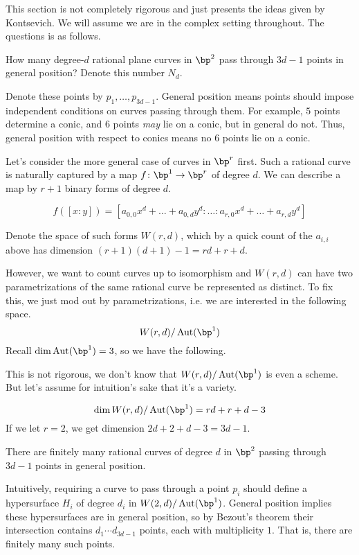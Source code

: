 \documentclass[12pt]{article}
\begin{document}
This section is not completely rigorous and just presents the ideas given by Kontsevich. We will assume we are in the complex setting throughout. The questions is as follows.

\begin{question}
  How many degree-$d$ rational plane curves in $\bp^2$ pass through $3d-1$ points in general position? Denote this number $N_d$.
\end{question}

Denote these points by $p_1, \ldots, p_{3d-1}$. General position means points should impose independent conditions on curves passing through them. For example, $5$ points determine a conic, and $6$ points \textit{may} lie on a conic, but in general do not. Thus, general position with respect to conics means no $6$ points lie on a conic.

Let's consider the more general case of curves in $\bp^r$ first. Such a rational curve is naturally captured by a map $f \colon \bp^1 \to \bp^r$ of degree $d$. We can describe a map by $r+1$ binary forms of degree $d$.

\[f([x \colon y]) = [a_{0,0}x^d + \ldots + a_{0,d}y^d\colon \ldots \colon a_{r,0}x^d + \ldots + a_{r,d}y^d]  \]

Denote the space of such forms $W(r,d)$, which by a quick count of the $a_{i,i}$ above has dimension $(r+1)(d+1) - 1 = rd +r + d$. 

However, we want to count curves up to isomorphism and $W(r,d)$ can have two parametrizations of the same rational curve be represented as distinct. To fix this, we just mod out by parametrizations, i.e. we are interested in the following space.
\[W(r,d)/\Aut(\bp^1)\]
Recall $\dim \Aut(\bp^1) = 3$, so we have the following.
\begin{note}
  This is not rigorous, we don't know that $W(r,d)/\Aut(\bp^1)$ is even a scheme. But let's assume for intuition's sake that it's a variety.
\end{note}
\[\dim W(r,d)/\Aut(\bp^1) = rd + r + d - 3\]
If we let $r = 2$, we get dimension $2d + 2 + d - 3 = 3d - 1$.
\begin{cor}
  There are finitely many rational curves of degree $d$ in $\bp^2$ passing through $3d-1$ points in general position.
\end{cor}

Intuitively, requiring a curve to pass through a point $p_i$ should define a hypersurface $H_i$ of degree $d_i$ in $W(2,d)/\Aut(\bp^1)$. General position implies these hypersurfaces are in general position, so by Bezout's theorem their intersection contains $d_1 \cdots d_{3d-1}$ points, each with multiplicity $1$. That is, there are finitely many such points.
\end{document}
